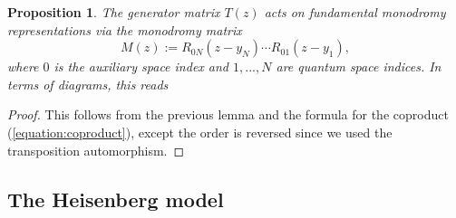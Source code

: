 \documentclass[11pt]{report}
\newtheorem{prop}[theorem]{Proposition}
\theoremstyle{definition}
\theoremstyle{remark}
\theoremstyle{remark}
\begin{document}
\begin{prop}
The generator matrix $T(z)$ acts on fundamental monodromy representations via the \emph{monodromy matrix}
\begin{equation*}
M(z) := R_{0N}(z-y_N) \cdots R_{01}(z-y_1),
\end{equation*}
where $0$ is the auxiliary space index and $1,...,N$ are quantum space indices. In terms of diagrams, this reads
\begin{center}
\end{center}
\end{prop}

\begin{proof}
This follows from the previous lemma and the formula for the coproduct (\ref{equation:coproduct}), except the order is reversed since we used the transposition automorphism.
\end{proof}

\subsection{The Heisenberg model}
\end{document}
